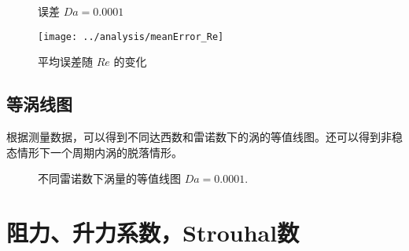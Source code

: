 \begin{figure}
	\centering
	\begin{minipage}{\textwidth}
		\centering
	\end{minipage}
	\centering
	\begin{minipage}{\textwidth}
		\centering
	\end{minipage}
	\caption{误差 $Da=0.0001$}
	\label{fig: resd}
\end{figure}

\begin{figure}
	\centering
	\texttt{[image: ../analysis/meanError\_Re]}
	\caption{平均误差随 $Re$ 的变化}
	\label{fig: error}
\end{figure}

\subsection{等涡线图}

根据测量数据，可以得到不同达西数和雷诺数下的涡的等值线图。还可以得到非稳态情形下一个周期内涡的脱落情形。

\begin{figure}
	\centering
	\begin{minipage}{\textwidth}
		\centering
	\end{minipage}
	\centering
	\begin{minipage}{\textwidth}
		\centering
	\end{minipage}
	\centering
	\begin{minipage}{\textwidth}
		\centering
	\end{minipage}
	\caption{不同雷诺数下涡量的等值线图 $Da=0.0001$.}
\end{figure}

\section{阻力、升力系数，Strouhal数}

